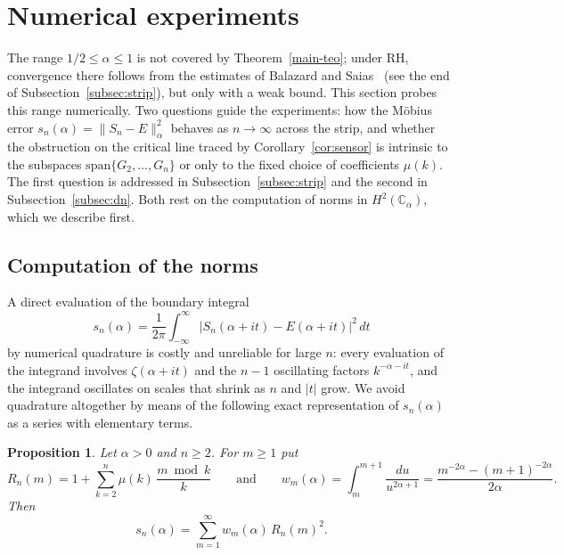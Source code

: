 \documentclass[11pt]{extarticle}
\numberwithin{equation}{section}
\theoremstyle{plain}
\newtheorem{proposition}[theorem]{Proposition}
\theoremstyle{remark}
\begin{document}
\section{Numerical experiments}\label{sec:numerics}

The range $1/2 \leq \alpha \leq 1$ is not covered by Theorem~\ref{main-teo}; under
RH, convergence there follows from the estimates of Balazard and
Saias~\cite{Balazard} (see the end of Subsection~\ref{subsec:strip}), but only with a
weak bound. This section probes this range numerically. Two
questions guide the experiments: how the M\"obius error
$s_n(\alpha) = \|S_n - E\|^2_\alpha$ behaves as $n \to \infty$ across the strip, and
whether the obstruction on the critical line traced by Corollary~\ref{cor:sensor} is
intrinsic to the subspaces $\mathrm{span}\{G_2, \dots, G_n\}$ or only to the fixed
choice of coefficients $\mu(k)$. The first question is addressed in
Subsection~\ref{subsec:strip} and the second in Subsection~\ref{subsec:dn}. Both rest
on the computation of norms in $H^2(\mathbb{C}_\alpha)$, which we describe first.

\subsection{Computation of the norms}\label{subsec:method}

A direct evaluation of the boundary integral
\[
s_n(\alpha) = \frac{1}{2\pi}\int_{-\infty}^{\infty} \bigl|S_n(\alpha+it) - E(\alpha+it)\bigr|^2\,dt
\]
by numerical quadrature is costly and unreliable for large $n$: every evaluation of
the integrand involves $\zeta(\alpha+it)$ and the $n-1$ oscillating factors
$k^{-\alpha-it}$, and the integrand oscillates on scales that shrink as $n$ and $|t|$
grow. We avoid quadrature altogether by means of the following exact representation
of $s_n(\alpha)$ as a series with elementary terms.

\begin{proposition}\label{prop:exact}
Let $\alpha > 0$ and $n \geq 2$. For $m \geq 1$ put
\[
R_n(m) = 1 + \sum_{k=2}^{n} \mu(k)\,\frac{m \bmod k}{k}
\qquad\text{and}\qquad
w_m(\alpha) = \int_m^{m+1} \frac{du}{u^{2\alpha+1}} = \frac{m^{-2\alpha} - (m+1)^{-2\alpha}}{2\alpha}.
\]
Then
\begin{equation}\label{eq:exact}
s_n(\alpha) = \sum_{m=1}^{\infty} w_m(\alpha)\, R_n(m)^2 .
\end{equation}
\end{proposition}
\end{document}
